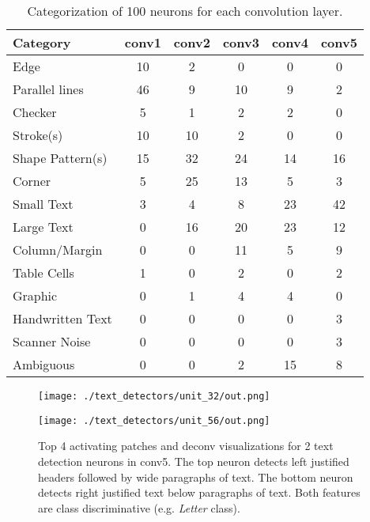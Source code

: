 \documentclass[10pt, conference, compsocconf]{IEEEtran}
\newcommand{\squeezeup}{\vspace{-2.5mm}}
\begin{document}
\begin{table}
\centering

\begin{tabular}{|l|c|c|c|c|c|}
\hline
Category          & conv1 & conv2 & conv3 & conv4 & conv5 \\
\hline
Edge              & 10    & 2     & 0     & 0     & 0     \\
Parallel lines    & 46    & 9     & 10    & 9     & 2     \\
Checker           & 5     & 1     & 2     & 2     & 0     \\
Stroke(s)         & 10    & 10    & 2     & 0     & 0     \\
Shape Pattern(s)  & 15    & 32    & 24    & 14    & 16    \\
Corner            & 5     & 25    & 13    & 5     & 3     \\
Small Text        & 3     & 4     & 8     & 23    & 42    \\
Large Text        & 0     & 16    & 20    & 23    & 12    \\
Column/Margin     & 0     & 0     & 11    & 5     & 9     \\
Table Cells       & 1     & 0     & 2     & 0     & 2     \\
Graphic           & 0     & 1     & 4     & 4     & 0     \\
Handwritten Text  & 0     & 0     & 0     & 0     & 3     \\
Scanner Noise     & 0     & 0     & 0     & 0     & 3     \\
Ambiguous        & 0     & 0     & 2     & 15    & 8     \\
\hline
\end{tabular}

\caption{Categorization of 100 neurons for each convolution layer.}
\label{tab:neurons}
\squeezeup
\end{table}

\begin{figure}
\centering
\texttt{[image: ./text\_detectors/unit\_32/out.png]}
\vspace{4pt}

\texttt{[image: ./text\_detectors/unit\_56/out.png]}

\caption{Top 4 activating patches and deconv visualizations for 2 text detection neurons in conv5.  The top neuron detects left justified headers followed by wide paragraphs of text.  The bottom neuron detects right justified text below paragraphs of text.  Both features are class discriminative (e.g. \emph{Letter} class).}
\label{fig:text_detectors}
\squeezeup
\squeezeup
\end{figure}
\end{document}
